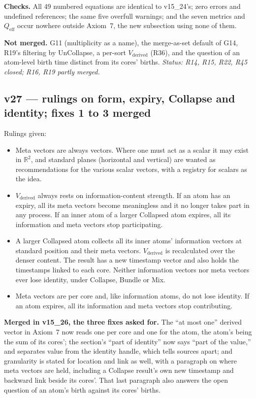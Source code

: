 \documentclass[11pt]{article}
\begin{document}
\textbf{Checks.} All 49 numbered equations are identical to v15\_24's;
zero errors and undefined references; the same five overfull warnings; and
the seven metrics and $Q_{\mathrm{eff}}$ occur nowhere outside Axiom~7, the
new subsection using none of them.

\textbf{Not merged.} G11 (multiplicity as a name), the merge-as-set default
of G14, R19's filtering by UnCollapse, a per-sort $V_{\text{derived}}$
(R36), and the question of an atom-level birth time distinct from its
cores' births.
\emph{Status: R14, R15, R22, R45 closed; R16, R19 partly merged.}


\subsection*{v27 --- rulings on form, expiry, Collapse and identity; fixes 1 to 3 merged}
Rulings given:
\begin{itemize}
\item Meta vectors are always vectors. Where one must act as a scalar it
may exist in $\mathbb{R}^2$, and standard planes (horizontal and vertical)
are wanted as recommendations for the various scalar vectors, with a
registry for scalars as the idea.
\item $V_{\text{derived}}$ always rests on information-content strength.
If an atom has an expiry, all its meta vectors become meaningless and it
no longer takes part in any process. If an inner atom of a larger
Collapsed atom expires, all its information and meta vectors stop
participating.
\item A larger Collapsed atom collects all its inner atoms' information
vectors at standard position and their meta vectors. $V_{\text{derived}}$
is recalculated over the denser content. The result has a new timestamp
vector and also holds the timestamps linked to each core. Neither
information vectors nor meta vectors ever lose identity, under Collapse,
Bundle or Mix.
\item Meta vectors are per core and, like information atoms, do not lose
identity. If an atom expires, all its information and meta vectors stop
contributing.
\end{itemize}

\textbf{Merged in v15\_26, the three fixes asked for.}
The ``at most one'' derived vector in Axiom~7 now reads one per core and
one for the atom, the atom's being the sum of its cores'; the section's
``part of identity'' now says ``part of the value,'' and separates value
from the identity handle, which tells sources apart; and granularity is
stated for location and link as well, with a paragraph on where meta
vectors are held, including a Collapse result's own new timestamp and
backward link beside its cores'. That last paragraph also answers the open
question of an atom's birth against its cores' births.
\end{document}
